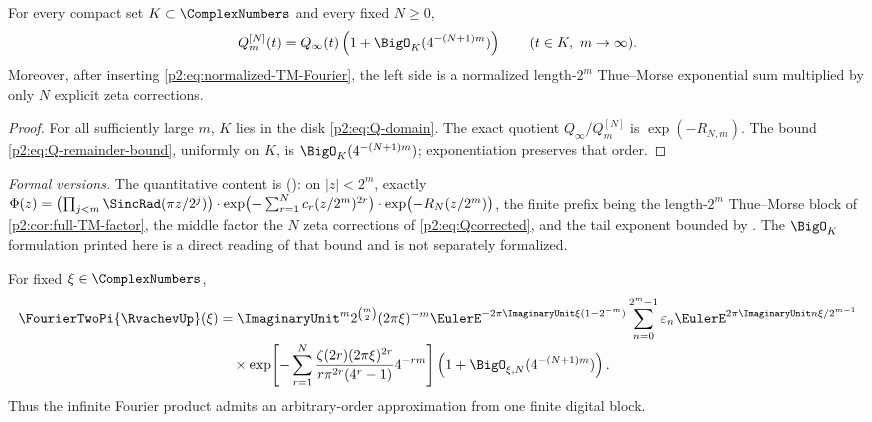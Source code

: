 \documentclass[11pt,oneside]{article}
\numberwithin{equation}{section}
\theoremstyle{definition}
\theoremstyle{remark}
\newcommand{\eps}{\varepsilon}
\begin{document}
\begin{corollary}
\label{p2:cor:arbitrary-Q}
For every compact set $K\subset\ComplexNumbers$ and every fixed $N\ge0$,
\begin{equation}
 Q_m^{[N]}(t)=Q_\infty(t)
 \left(1+\BigO_K(4^{-(N+1)m})\right)
 \qquad(t\in K,\ m\to\infty).
 \label{p2:eq:arbitrary-Q}
\end{equation}
Moreover, after inserting \eqref{p2:eq:normalized-TM-Fourier}, the left side is a normalized
length-$2^m$ Thue--Morse exponential sum multiplied by only $N$ explicit zeta corrections.
\newresult
\end{corollary}

\begin{proof}
For all sufficiently large $m$, $K$ lies in the disk \eqref{p2:eq:Q-domain}.  The exact quotient
$Q_\infty/Q_m^{[N]}$ is $\exp(-R_{N,m})$.  The bound
\eqref{p2:eq:Q-remainder-bound}, uniformly on $K$, is $\BigO_K(4^{-(N+1)m})$; exponentiation
preserves that order.
\end{proof}

\emph{Formal versions.}  The quantitative content is
(): on $|z|<2^m$, exactly
$\Phi(z)=\bigl(\prod_{j<m}\SincRad(\pi z/2^j)\bigr)\cdot
\exp\bigl(-\sum_{r=1}^{N}c_r(z/2^m)^{2r}\bigr)\cdot\exp\bigl(-R_{N}(z/2^m)\bigr)$, the finite
prefix being the length-$2^m$ Thue--Morse block of \cref{p2:cor:full-TM-factor}, the middle
factor the $N$ zeta corrections of \eqref{p2:eq:Qcorrected}, and the tail exponent bounded by
.  The $\BigO_K$ formulation printed here is a direct
reading of that bound and is not separately formalized.

\begin{corollary}
\label{p2:cor:up-Fourier-block}
For fixed $\xi\in\ComplexNumbers$,
\begin{align}
 \FourierTwoPi{\RvachevUp}(\xi)
 &=\ImaginaryUnit^m2^{\binom m2}(2\pi\xi)^{-m}
   \EulerE^{-2\pi\ImaginaryUnit\xi(1-2^{-m})}
   \sum_{n=0}^{2^m-1}\eps_n
   \EulerE^{2\pi\ImaginaryUnit n\xi/2^{m-1}}
 \notag\\[-0.2em]
 &\quad\times
 \exp\!\left[-\sum_{r=1}^{N}
 \frac{\zeta(2r)(2\pi\xi)^{2r}}{r\pi^{2r}(4^r-1)}4^{-rm}\right]
 \left(1+\BigO_{\xi,N}(4^{-(N+1)m})\right).
 \label{p2:eq:up-TM-approx}
\end{align}
Thus the infinite Fourier product admits an arbitrary-order approximation from one finite
digital block.
\end{corollary}
\end{document}
